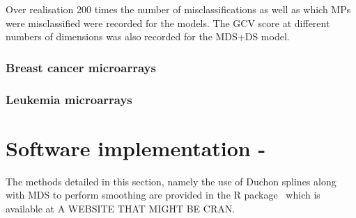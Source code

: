 Over realisation 200 times the number of misclassifications as well as which MPs were misclassified were recorded for the models. The GCV score at different numbers of dimensions was also recorded for the MDS+DS model.




\subsubsection{Breast cancer microarrays}




\subsubsection{Leukemia microarrays}



\section{Software implementation - \mdspack}

The methods detailed in this section, namely the use of Duchon splines along with MDS to perform smoothing are provided in the \textsf{R} package \mdspack\ which is available at A WEBSITE THAT MIGHT BE CRAN.



